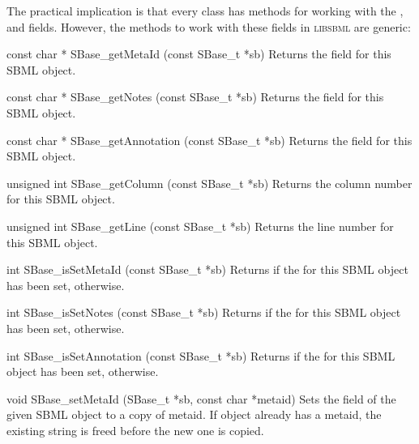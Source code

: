 \documentclass{sbmlmanual}
\newcommand{\libsbml}{\textsc{libsbml}}
\begin{document}
The practical implication is that every class has methods for working with
the ,  and  fields.
However, the methods to work with these fields in \libsbml{} are generic:


\begin{methoddef}{const char * SBase\_getMetaId (const SBase\_t *sb)}
  Returns the  field for this SBML object.
\end{methoddef}


\begin{methoddef}{const char * SBase\_getNotes (const SBase\_t *sb)}
  Returns the  field for this SBML object.
\end{methoddef}


\begin{methoddef}{const char * SBase\_getAnnotation (const SBase\_t *sb)}
  Returns the  field for this SBML object.
\end{methoddef}


\begin{methoddef}{unsigned int SBase\_getColumn (const SBase\_t *sb)}
  Returns the column number for this SBML object.
\end{methoddef}


\begin{methoddef}{unsigned int SBase\_getLine (const SBase\_t *sb)}
  Returns the line number for this SBML object.
\end{methoddef}


\begin{methoddef}{int SBase\_isSetMetaId (const SBase\_t *sb)}
  Returns  if the  for this SBML object has been
  set,  otherwise.
\end{methoddef}


\begin{methoddef}{int SBase\_isSetNotes (const SBase\_t *sb)}
  Returns  if the  for this SBML object has been set,
   otherwise.
\end{methoddef}


\begin{methoddef}{int SBase\_isSetAnnotation (const SBase\_t *sb)}
  Returns  if the  for this SBML object has been
  set,  otherwise.
\end{methoddef}


\begin{methoddef}{void SBase\_setMetaId (SBase\_t *sb, const char *metaid)}
  Sets the  field of the given SBML object to a copy of
  metaid.  If object already has a metaid, the existing string is freed
  before the new one is copied.
\end{methoddef}
\end{document}
